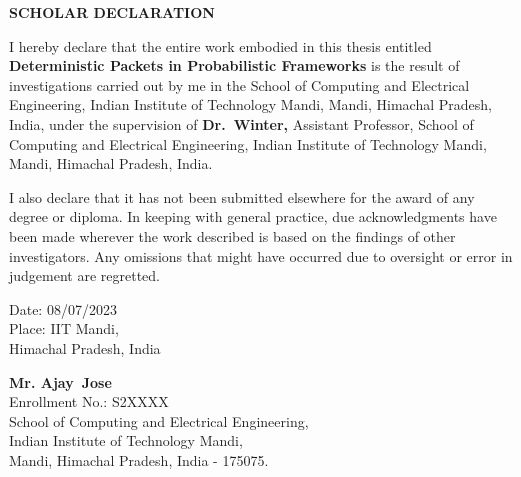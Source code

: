 \thispagestyle{empty}
\vspace*{2cm}
\centerline{\Large \bf SCHOLAR DECLARATION}
\vspace*{2cm}

I hereby declare that the entire work embodied in this thesis entitled \textbf{Deterministic Packets in Probabilistic Frameworks} 
is the result of investigations carried out by me in the School of Computing and Electrical
Engineering, Indian Institute of Technology Mandi, Mandi, Himachal Pradesh, India, under 
the supervision of {\bf Dr.~Winter,} Assistant Professor, School of Computing 
and Electrical Engineering, Indian Institute of Technology Mandi, Mandi, Himachal Pradesh, India.

I also declare that it has not been submitted elsewhere for the award of any degree or diploma. 
In keeping with general practice, due acknowledgments have been made wherever the work described 
is based on the findings of other investigators. Any omissions that might have occurred due to
oversight or error in judgement are regretted. \\[2.5cm]


\noindent \begin{minipage}[c]{0.4\columnwidth}
Date: 08/07/2023\\
Place: IIT Mandi, \\
Himachal Pradesh, India
\end{minipage}
\noindent \begin{minipage}[c]{0.6\columnwidth}
\begin{flushright}
	\textbf{Mr. Ajay~Jose}\\
    Enrollment No.: S2XXXX\\
    School of Computing and Electrical Engineering,\\
    Indian Institute of Technology Mandi,\\
    Mandi, Himachal Pradesh, India - 175075.
\end{flushright}
\end{minipage}
